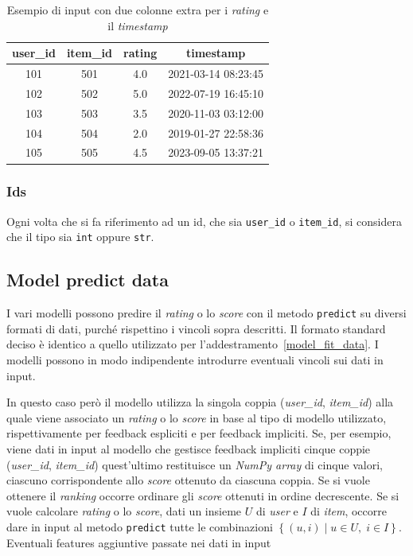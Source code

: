 \begin{table}[H]
    \centering
    \begin{tabular}{|c|c|c|c|}
    \hline
    \textbf{user\_id} & \textbf{item\_id} & \textbf{rating} & \textbf{timestamp} \\
    \hline
        101 & 501 & 4.0 & 2021-03-14 08:23:45 \\
        102 & 502 & 5.0 & 2022-07-19 16:45:10 \\
        103 & 503 & 3.5 & 2020-11-03 03:12:00 \\
        104 & 504 & 2.0 & 2019-01-27 22:58:36 \\
        105 & 505 & 4.5 & 2023-09-05 13:37:21 \\
    \hline
    \end{tabular}
    \caption{Esempio di input con due colonne extra per i \textit{rating} e il \textit{timestamp}}
    \label{tab:ratings}
\end{table}

\subsubsection{Ids}

Ogni volta che si fa riferimento ad un id, che sia \texttt{user\_id} o \texttt{item\_id}, si considera che il tipo sia \texttt{int} oppure \texttt{str}. 

\subsection{Model predict data}\label{model_predict_data}

I vari modelli possono predire il \textit{rating} o lo \textit{score} con il metodo \texttt{predict} su diversi formati di dati, purché rispettino i vincoli sopra descritti. Il formato standard deciso è identico a quello utilizzato per l'addestramento~\ref{model_fit_data}. I modelli possono in modo indipendente introdurre eventuali vincoli sui dati in input.

In questo caso però il modello utilizza la singola coppia (\textit{user\_id}, \textit{item\_id}) alla quale viene associato un \textit{rating} o lo \textit{score} in base al tipo di modello utilizzato, rispettivamente per feedback espliciti e per feedback impliciti. Se, per esempio, viene dati in input al modello che gestisce feedback impliciti cinque coppie (\textit{user\_id}, \textit{item\_id}) quest'ultimo restituisce un \textit{NumPy array} di cinque valori, ciascuno corrispondente allo \textit{score} ottenuto da ciascuna coppia. Se si vuole ottenere il \textit{ranking} occorre ordinare gli \textit{score} ottenuti in ordine decrescente. Se si vuole calcolare \textit{rating} o lo \textit{score}, dati un insieme $U$ di \textit{user} e $I$ di \textit{item}, occorre dare in input al metodo \texttt{predict} tutte le combinazioni $\left\{(u, i) \mid u \in U,\; i \in I \right\}$. Eventuali features aggiuntive passate nei dati in input 

